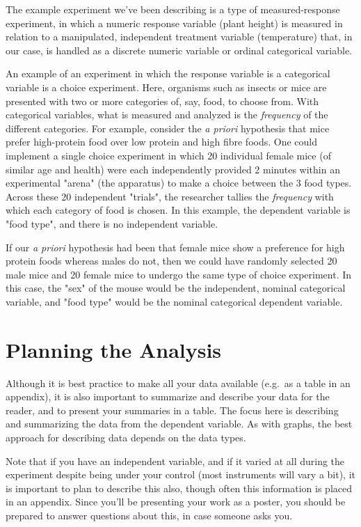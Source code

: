 \documentclass[
]{book}
\begin{document}
The example experiment we've been describing is a type of measured-response experiment, in which a numeric response variable (plant height) is measured in relation to a manipulated, independent treatment variable (temperature) that, in our case, is handled as a discrete numeric variable or ordinal categorical variable.

An example of an experiment in which the response variable is a categorical variable is a choice experiment. Here, organisms such as insects or mice are presented with two or more categories of, say, food, to choose from. With categorical variables, what is measured and analyzed is the \emph{frequency} of the different categories. For example, consider the \emph{a priori} hypothesis that mice prefer high-protein food over low protein and high fibre foods. One could implement a single choice experiment in which 20 individual female mice (of similar age and health) were each independently provided 2 minutes within an experimental "arena" (the apparatus) to make a choice between the 3 food types. Across these 20 independent "trials", the researcher tallies the \emph{frequency} with which each category of food is chosen. In this example, the dependent variable is "food type", and there is no independent variable.

If our \emph{a priori} hypothesis had been that female mice show a preference for high protein foods whereas males do not, then we could have randomly selected 20 male mice and 20 female mice to undergo the same type of choice experiment. In this case, the "sex" of the mouse would be the independent, nominal categorical variable, and "food type" would be the nominal categorical dependent variable.

\hypertarget{planning-the-analysis}{%
\chapter*{Planning the Analysis}\label{planning-the-analysis}}

Although it is best practice to make all your data available (e.g.~as a table in an appendix), it is also important to summarize and describe your data for the reader, and to present your summaries in a table. The focus here is describing and summarizing the data from the dependent variable. As with graphs, the best approach for describing data depends on the data types.

Note that if you have an independent variable, and if it varied at all during the experiment despite being under your control (most instruments will vary a bit), it is important to plan to describe this also, though often this information is placed in an appendix. Since you'll be presenting your work as a poster, you should be prepared to answer questions about this, in case someone asks you.
\end{document}
